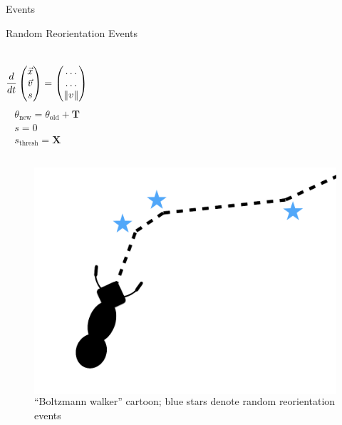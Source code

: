\begin{subsection}{Events}
\begin{frame}{Random Reorientation Events \scriptsize{\cite{khuong_how_2013}}}
\begin{columns}[T,onlytextwidth]
\begin{align*}
\frac{d}{dt} \begin{pmatrix}\vec{x}\\\vec{v}\\s\end{pmatrix} = \begin{pmatrix}\ldots \\ \ldots\\ \lVert v\rVert\end{pmatrix}
\end{align*}
\begin{align*}
\theta_{\operatorname{new}} = \theta_{\operatorname{old}} + \bm{T} \\
s = 0 \\
s_{\operatorname{thresh}} = \bm{X}
\end{align*}
\end{columns}
\vspace{-2ex}
\begin{figure}
	\begin{columns}[T, onlytextwidth]
		\includegraphics[width=\textwidth]{images/model_components_cartoons_009}
		\caption{\footnotesize{``Boltzmann walker'' cartoon; blue stars denote random reorientation events}}
	\end{columns}

\end{figure}
\end{frame}
\end{subsection}
